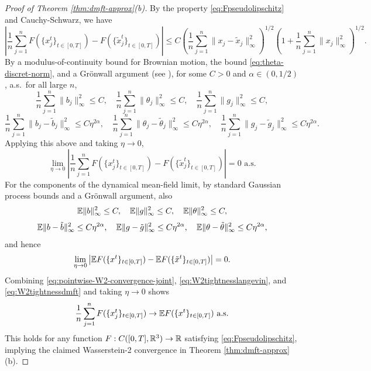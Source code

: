 \begin{proof}[Proof of Theorem \ref{thm:dmft-approx}(b)]
By the property \eqref{eq:Fpseudolipschitz} and Cauchy-Schwarz, we have
\[\left|\frac{1}{n}\sum_{j=1}^n F(\{x_j^t\}_{t \in [0,T]})
-F(\{\tilde x_j^t\}_{t \in [0,T]})\right|
\leq C\left(\frac{1}{n}\sum_{j=1}^n \|x_j-\tilde x_j\|_\infty^2\right)^{1/2}
\left(1+\frac{1}{n}\sum_{j=1}^n \|x_j\|_\infty^2\right)^{1/2}.\]
By a modulus-of-continuity bound for Brownian motion,
the bound \eqref{eq:theta-discret-norm}, and a Gr\"onwall argument
(see \cite[Theorem 2.5(b)]{fan2025dynamicalI}), for some $C>0$ and
$\alpha \in (0,1/2)$, a.s.\ for all large $n$,
\[\frac{1}{n}\sum_{j=1}^n \|b_j\|_\infty^2 \leq C,
\quad \frac{1}{n}\sum_{j=1}^n \|\theta_j\|_\infty^2 \leq C,
\quad \frac{1}{n}\sum_{j=1}^n \|g_j\|_\infty^2 \leq C,\]
\[\frac{1}{n}\sum_{j=1}^n \|b_j-\tilde b_j\|_\infty^2 \leq C\eta^{2\alpha},
\quad \frac{1}{n}\sum_{j=1}^n \|\theta_j-\tilde\theta_j\|_\infty^2 \leq
C\eta^{2\alpha},
\quad \frac{1}{n}\sum_{j=1}^n \|g_j-\tilde g_j\|_\infty^2 \leq
C\eta^{2\alpha}.\]
Applying this above and taking $\eta \to 0$,
\begin{equation}\label{eq:W2tightnesslangevin}
\lim_{\eta \to 0}
\left|\frac{1}{n}\sum_{j=1}^n F(\{x_j^t\}_{t \in [0,T]})
-F(\{\tilde x_j^t\}_{t \in [0,T]})\right|=0 \text{ a.s.}
\end{equation}
For the components of the dynamical mean-field limit,
by standard Gaussian process bounds and a Gr\"onwall argument, also
\[\mathbb{E}\|b\|_\infty^2 \leq C,
\quad \mathbb{E}\|g\|_\infty^2 \leq C,
\quad \mathbb{E}\|\theta\|_\infty^2 \leq C,\]
\[\mathbb{E}\|b-\tilde b\|_\infty^2 \leq C\eta^{2\alpha},
\quad \mathbb{E}\|g-\tilde g\|_\infty^2 \leq C\eta^{2\alpha},
\quad \mathbb{E}\|\theta-\tilde\theta\|_\infty^2 \leq C\eta^{2\alpha},\]
and hence
\begin{equation}\label{eq:W2tightnessdmft}
\lim_{\eta \to 0} \big|\mathbb{E} F(\{x^t\}_{t \in [0,T]})
-\mathbb{E} F(\{\tilde x^t\}_{t \in [0,T]})\big|=0.
\end{equation}
Combining \eqref{eq:pointwise-W2-convergence-joint}, \eqref{eq:W2tightnesslangevin},
and \eqref{eq:W2tightnessdmft} and taking $\eta \to 0$
shows
\begin{align}\label{eq:pointwise-W2-convergence-2}
\frac{1}{n}\sum_{j=1}^n F(\{x_j^t\}_{t \in [0,T]})
\rightarrow \mathbb{E} F(\{x^t\}_{t \in [0,T]}) \text{ a.s.}
\end{align}
This holds for any function $F:C([0,T],\mathbb{R}^3) \to \mathbb{R}$
satisfying \eqref{eq:Fpseudolipschitz}, implying the claimed Wasserstein-2
convergence in Theorem \ref{thm:dmft-approx}(b).
\end{proof}

